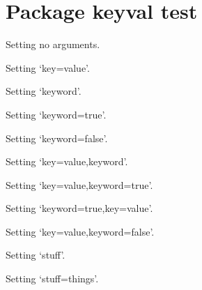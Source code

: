 \documentclass{article}
\begin{document}
  \section{Package keyval test}
  
  Setting no arguments. 
  
  Setting `key=value'. 
  
  Setting `keyword'. 

  Setting `keyword=true'. 

  Setting `keyword=false'. 
  
  Setting `key=value,keyword'. 
  
  Setting `key=value,keyword=true'. 

  Setting `keyword=true,key=value'. 

  Setting `key=value,keyword=false'. 
  
  Setting `stuff'. 
  
  Setting `stuff=things'. 
\end{document}
